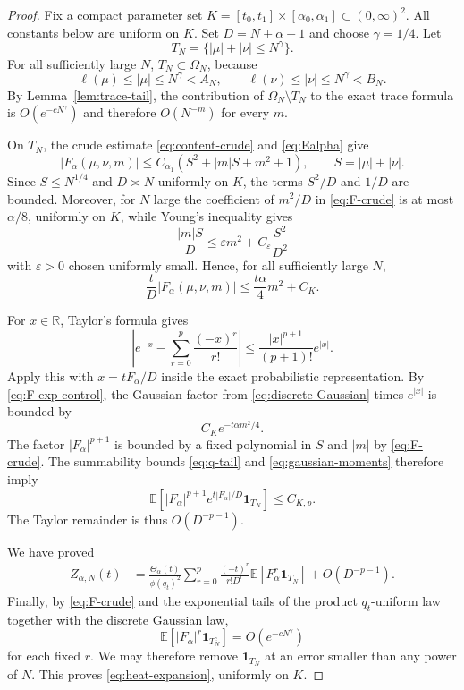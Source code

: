 \documentclass[11pt,a4paper,reqno]{article}
\theoremstyle{definition}
\theoremstyle{remark}
\newcommand\R{{\mathbb R}}
\newcommand\E{{\mathbb E}}
\newcommand\one{{\mathbf 1}}
\newcommand\ellpart{{\ell}}
\begin{document}
\begin{proof}
Fix a compact parameter set $K=[t_0,t_1]\times[\alpha_0,\alpha_1]\subset(0,\infty)^2$.  All constants below are uniform on $K$.  Set $D=N+\alpha-1$ and choose $\gamma=1/4$.  Let
\[
T_N=\{|\mu|+|\nu|\leq N^\gamma\}.
\]
For all sufficiently large $N$, $T_N\subset\Omega_N$, because
\[
\ellpart(\mu)\leq|\mu|\leq N^\gamma<A_N, \qquad \ellpart(\nu)\leq|\nu|\leq N^\gamma<B_N.
\]
By Lemma~\ref{lem:trace-tail}, the contribution of $\Omega_N\setminus T_N$ to the exact trace formula is $O(e^{-cN^\gamma})$ and therefore $O(N^{-m})$ for every $m$.

On $T_N$, the crude estimate \eqref{eq:content-crude} and \eqref{eq:Ealpha} give
\begin{equation}\label{eq:F-crude}
|F_\alpha(\mu,\nu,m)| \leq C_{\alpha_1}\left(S^2+|m|S+m^2+1\right), \qquad S=|\mu|+|\nu|.
\end{equation}
Since $S\leq N^{1/4}$ and $D\asymp N$ uniformly on $K$, the terms $S^2/D$ and $1/D$ are bounded.  Moreover, for $N$ large the coefficient of $m^2/D$ in \eqref{eq:F-crude} is at most $\alpha/8$, uniformly on $K$, while Young's inequality gives
\[
\frac{|m|S}{D}\leq \varepsilon m^2+C_\varepsilon\frac{S^2}{D^2}
\]
with $\varepsilon>0$ chosen uniformly small.  Hence, for all sufficiently large $N$,
\begin{equation}\label{eq:F-exp-control}
\frac{t}{D}|F_\alpha(\mu,\nu,m)| \leq \frac{t\alpha}{4}m^2+C_K.
\end{equation}

For $x\in\R$, Taylor's formula gives
\begin{equation}\label{eq:Taylor-bound}
\left|e^{-x}-\sum_{r=0}^{p}\frac{(-x)^r}{r!}\right| \leq \frac{|x|^{p+1}}{(p+1)!}e^{|x|}.
\end{equation}
Apply this with $x=tF_\alpha/D$ inside the exact probabilistic representation.  By \eqref{eq:F-exp-control}, the Gaussian factor from \eqref{eq:discrete-Gaussian} times $e^{|x|}$ is bounded by
\[
C_K e^{-t\alpha m^2/4}.
\]
The factor $|F_\alpha|^{p+1}$ is bounded by a fixed polynomial in $S$ and $|m|$ by \eqref{eq:F-crude}.  The summability bounds \eqref{eq:q-tail} and \eqref{eq:gaussian-moments} therefore imply
\[
\E\left[ |F_\alpha|^{p+1}e^{t|F_\alpha|/D}\one_{T_N} \right]\leq C_{K,p}.
\]
The Taylor remainder is thus $O(D^{-p-1})$.

We have proved
\begin{align*}
Z_{\alpha,N}(t)
&=\frac{\Theta_\alpha(t)}{\phi(q_t)^2}
\sum_{r=0}^{p}\frac{(-t)^r}{r!D^r}
\E\left[F_\alpha^r\one_{T_N}\right]
+O(D^{-p-1}).
\end{align*}
Finally, by \eqref{eq:F-crude} and the exponential tails of the product $q_t$-uniform law together with the discrete Gaussian law,
\[
\E\left[|F_\alpha|^r\one_{T_N^c}\right] =O(e^{-cN^\gamma})
\]
for each fixed $r$.  We may therefore remove $\one_{T_N}$ at an error smaller than any power of $N$.  This proves \eqref{eq:heat-expansion}, uniformly on $K$.
\end{proof}
\end{document}
